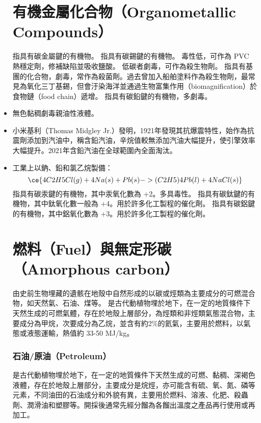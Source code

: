 \documentclass[a4paper,12pt]{report}
\begin{document}
\begin{itemize}
\section{有機金屬化合物（Organometallic Compounds）}
指具有碳金屬鍵的有機物。
指具有碳錫鍵的有機物。
毒性低，可作為 PVC 熱穩定劑，修補缺陷並吸收鹽酸。
低碳者劇毒，可作為殺生物劑。
指具有基團的化合物，劇毒，常作為殺菌劑。過去曾加入船舶塗料作為殺生物劑，最常見為氧化三丁基錫，但會汙染海洋並通過生物富集作用（biomagnification）於食物鏈（food chain）遞增。
指具有碳鉛鍵的有機物，多劇毒。
\bit
\item 無色黏稠劇毒親油性液體。
\item 小米基利（Thomas Midgley Jr.）發明，1921年發現其抗爆震特性，始作為抗震劑添加到汽油中，稱含鉛汽油，辛烷值較無添加汽油大幅提升，使引擎效率大幅提升。2021年含鉛汽油在全球範圍內全面淘汰。
\item 工業上以鈉、鉛和氯乙烷製備：
\[\ce{4C2H5Cl(g) + 4Na(s) + Pb(s) -> (C2H5)4Pb(l) + 4NaCl(s)}\]
\eit
{}
指具有碳汞鍵的有機物，其中汞氧化數為 +2。多具毒性。
指具有碳鈦鍵的有機物，其中鈦氧化數一般為 +4。用於許多化工製程的催化劑。
指具有碳鋁鍵的有機物，其中鋁氧化數為 +3。用於許多化工製程的催化劑。


\section{燃料（Fuel）與無定形碳（Amorphous carbon）}
由史前生物埋藏的遺骸在地殼中自然形成的以碳或烴類為主要成分的可燃混合物，如天然氣、石油、煤等。
是古代動植物埋於地下，在一定的地質條件下天然生成的可燃氣體，存在於地殼上層部分，為烴類和非烴類氣態混合物，主要成分為甲烷，次要成分為乙烷，並含有約2\%的氦氣，主要用於燃料，以氣態或液態運輸，熱值約 33-50 MJ/kg。
\subsubsection{石油/原油（Petroleum）}
是古代動植物埋於地下，在一定的地質條件下天然生成的可燃、黏稠、深褐色液體，存在於地殼上層部分，主要成分是烷烴，亦可能含有硫、氧、氮、磷等元素，不同油田的石油成分和外貌有異，主要用於燃料、溶液、化肥、殺蟲劑、潤滑油和塑膠等。開採後通常先經分餾為各餾出溫度之產品再行使用或再加工。

\end{itemize}
\end{document}
